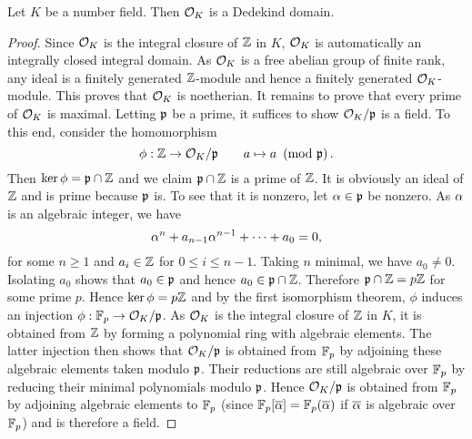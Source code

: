     \begin{theorem}\label{thm:ring_of_integers_is_Dedekind}
      Let $K$ be a number field. Then $\mathcal{O}_{K}$ is a Dedekind domain.
    \end{theorem}
    \begin{proof}
      Since $\mathcal{O}_{K}$ is the integral closure of $\mathbb{Z}$ in $K$, $\mathcal{O}_{K}$ is automatically an integrally closed integral domain. As $\mathcal{O}_{K}$ is a free abelian group of finite rank, any ideal is a finitely generated $\mathbb{Z}$-module and hence a finitely generated $\mathcal{O}_{K}$-module. This proves that $\mathcal{O}_{K}$ is noetherian. It remains to prove that every prime of $\mathcal{O}_{K}$ is maximal. Letting $\mathfrak{p}$ be a prime, it suffices to show $\mathcal{O}_{K}/\mathfrak{p}$ is a field. To this end, consider the homomorphism
      \[
        \phi:\mathbb{Z} \to \mathcal{O}_{K}/\mathfrak{p} \qquad a \mapsto a \ \left(\text{mod }\mathfrak{p}\right).
      \]
      Then $\ker\phi = \mathfrak{p} \cap \mathbb{Z}$ and we claim $\mathfrak{p} \cap \mathbb{Z}$ is a prime of $\mathbb{Z}$. It is obviously an ideal of $\mathbb{Z}$ and is prime because $\mathfrak{p}$ is. To see that it is nonzero, let $\alpha \in \mathfrak{p}$ be nonzero. As $\alpha$ is an algebraic integer, we have
      \[
        \alpha^{n}+a_{n-1}\alpha^{n-1}+\cdots+a_{0} = 0,
      \]
      for some $n \ge 1$ and $a_{i} \in \mathbb{Z}$ for $0 \le i \le n-1$. Taking $n$ minimal, we have $a_{0} \neq 0$. Isolating $a_{0}$ shows that $a_{0} \in \mathfrak{p}$ and hence $a_{0} \in \mathfrak{p} \cap \mathbb{Z}$. Therefore $\mathfrak{p} \cap \mathbb{Z} = p\mathbb{Z}$ for some prime $p$. Hence $\ker\phi = p\mathbb{Z}$ and by the first isomorphism theorem, $\phi$ induces an injection $\phi:\mathbb{F}_{p} \to \mathcal{O}_{K}/\mathfrak{p}$. As $\mathcal{O}_{K}$ is the integral closure of $\mathbb{Z}$ in $K$, it is obtained from $\mathbb{Z}$ by forming a polynomial ring with algebraic elements. The latter injection then shows that $\mathcal{O}_{K}/\mathfrak{p}$ is obtained from $\mathbb{F}_{p}$ by adjoining these algebraic elements taken modulo $\mathfrak{p}$. Their reductions are still algebraic over $\mathbb{F}_{p}$ by reducing their minimal polynomials modulo $\mathfrak{p}$. Hence $\mathcal{O}_{K}/\mathfrak{p}$ is obtained from $\mathbb{F}_{p}$ by adjoining algebraic elements to $\mathbb{F}_{p}$ (since $\mathbb{F}_{p}[\overline{\alpha}] = \mathbb{F}_{p}(\overline{\alpha})$ if $\overline{\alpha}$ is algebraic over $\mathbb{F}_{p}$) and is therefore a field.
    \end{proof}

